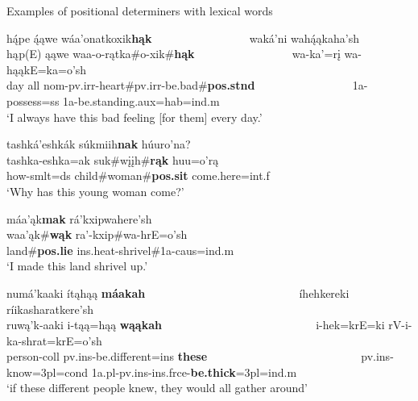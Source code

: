 \begin{exe}
    \item\label{ExamplesofPositionalDeterminers} Examples of positional determiners with lexical words

    \begin{xlist}
        \item\label{ExamplesofPositionalDeterminersA} \glll hą́pe ą́ąwe wáa'onatkoxik\textbf{hąk} ~ ~ ~ ~ ~ ~ ~ ~ ~ ~  waká'ni wahą́ąkaha'sh\\
        hąp(E) ąąwe waa-o-rątka\#o-xik\#\textbf{hąk} ~ ~ ~ ~ ~ ~ ~ ~ ~ ~  wa-ka'=rį wa-hąąkE=ka=o'sh\\
        \textnormal{day} \textnormal{all} nom-pv.irr-\textnormal{heart}\#pv.irr-\textnormal{be.bad}\#\textbf{pos.stnd} ~ ~ ~ ~ ~ ~ ~ ~ ~ ~ 1a-\textnormal{possess}=ss 1a-\textnormal{be.standing}.aux=hab=ind.m\\
        \glt `I always have this bad feeling [for them] every day.' \citep[56]{hollow1973a}
        

        \item\label{ExamplesofPositionalDeterminersB} \glll tashká'eshkák súkmiih\textbf{nak} húuro'na?\\
        tashka-eshka=ak suk\#wįįh\#\textbf{rąk} huu=o'rą\\
        \textnormal{how}-smlt=ds \textnormal{child}\#\textnormal{woman}\#\textbf{pos.sit} \textnormal{come.here}=int.f\\
        \glt `Why has this young woman come?' \citep[106]{hollow1973b}

        \item\label{ExamplesofPositionalDeterminersC} \glll máa'ąk\textbf{mak} rá'kxipwahere'sh\\
        waa'ąk\#\textbf{wąk} ra'-kxip\#wa-hrE=o'sh\\
        \textnormal{land}\#\textbf{pos.lie} ins.heat-\textnormal{shrivel}\#1a-caus=ind.m\\
        \glt `I made this land shrivel up.' \citep[217]{hollow1973a}

        \item\label{ExamplesofPositionalDeterminersD} \glll numá'kaaki ítąhąą \textbf{máakah} ~ ~ ~ ~ ~ ~ ~ ~ ~ ~ ~ ~ ~ ~ ~ ~  íhehkereki ríikasharatkere'sh\\
        ruwą'k-aaki i-tąą=hąą \textbf{wąąkah} ~ ~ ~ ~ ~ ~ ~ ~ ~ ~ ~ ~ ~ ~ ~ ~  i-hek=krE=ki rV-i-ka-shrat=krE=o'sh\\
        \textnormal{person}-coll pv.ins-\textnormal{be.different}=ins \textnormal{\bfseries these} ~ ~ ~ ~ ~ ~ ~ ~ ~ ~ ~ ~ ~ ~ ~ ~  pv.ins-\textnormal{know}=3pl=cond 1a.pl-pv.ins-ins.frce-\textnormal{\bfseries be.thick}=3pl=ind.m\\
        \glt `if these different people knew, they would all gather around' \citep[177]{hollow1973a}

    \end{xlist}
\end{exe}

